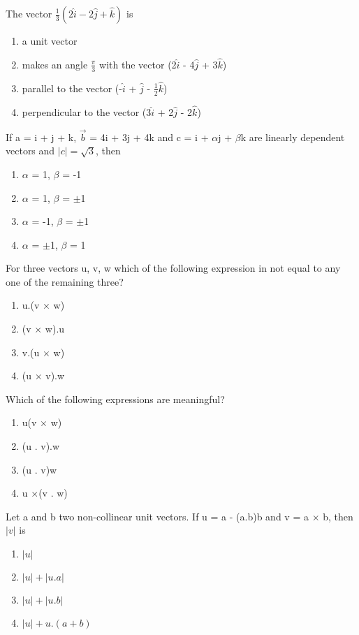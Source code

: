 \item The vector $\frac{1}{3}(2\hat{i} - 2\hat{j} + \hat{k})$ is
\begin{enumerate}
\item a unit vector
\item makes an angle $\frac{\pi}{3}$ with the vector (2$\hat{i}$ - 4$\hat{j}$ + 3$\hat{k}$)
\item parallel to the vector (-$\hat{i}$ + $\hat{j}$ - $\frac{1}{2}\hat{k}$)
\item perpendicular to the vector (3$\hat{i}$ + 2$\hat{j}$ - 2$\hat{k}$)
\end{enumerate}

\item If a = i + j + k, $\overrightarrow{b}$ = 4i + 3j + 4k and c = i + $\alpha$j + $\beta$k are linearly dependent vectors and $|c|=\sqrt{3}$, then
\begin{enumerate}
\item $\alpha$ = 1, $\beta$ = -1
\item $\alpha$ = 1, $\beta$ = $\pm$1
\item $\alpha$ = -1, $\beta$ = $\pm$1
\item $\alpha$ = $\pm$1, $\beta$ = 1
\end{enumerate}

\item For three vectors u, v, w which of the following expression in not equal to any one of the remaining three?
\begin{enumerate}
\item u.(v $\times$ w)
\item (v $\times$ w).u
\item v.(u $\times$ w)
\item (u $\times$ v).w
\end{enumerate}

\item Which of the following expressions are meaningful?
\begin{enumerate}
\item u(v $\times$ w)
\item (u . v).w
\item (u . v)w
\item u $\times$(v . w)
\end{enumerate}

\item Let a and b two non-collinear unit vectors. If u = a - (a.b)b and v = a $\times$ b, then $|v|$ is
\begin{enumerate}
\item $|u|$
\item $|u| + |u.a|$
\item $|u| + |u.b|$
\item $|u| + u.(a+b)$
\end{enumerate}

